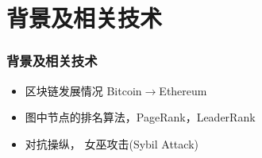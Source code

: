 
\section{背景及相关技术}
\begin{frame}
	\frametitle{背景及相关技术}
  \begin{itemize}[<+->]
  \item 区块链发展情况 Bitcoin$\longrightarrow$Ethereum
  \item 图中节点的排名算法，PageRank，LeaderRank
  \item 对抗操纵， 女巫攻击(Sybil Attack)
  \end{itemize}
\end{frame}
